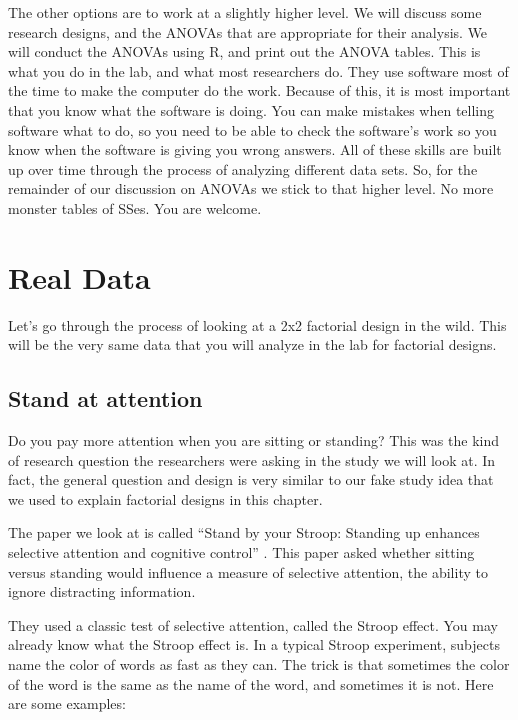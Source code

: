 \documentclass[
]{book}
\begin{document}
The other options are to work at a slightly higher level. We will discuss some research designs, and the ANOVAs that are appropriate for their analysis. We will conduct the ANOVAs using R, and print out the ANOVA tables. This is what you do in the lab, and what most researchers do. They use software most of the time to make the computer do the work. Because of this, it is most important that you know what the software is doing. You can make mistakes when telling software what to do, so you need to be able to check the software's work so you know when the software is giving you wrong answers. All of these skills are built up over time through the process of analyzing different data sets. So, for the remainder of our discussion on ANOVAs we stick to that higher level. No more monster tables of SSes. You are welcome.

\hypertarget{real-data}{%
\section{Real Data}\label{real-data}}

Let's go through the process of looking at a 2x2 factorial design in the wild. This will be the very same data that you will analyze in the lab for factorial designs.

\hypertarget{stand-at-attention}{%
\subsection{Stand at attention}\label{stand-at-attention}}

Do you pay more attention when you are sitting or standing? This was the kind of research question the researchers were asking in the study we will look at. In fact, the general question and design is very similar to our fake study idea that we used to explain factorial designs in this chapter.

The paper we look at is called ``Stand by your Stroop: Standing up enhances selective attention and cognitive control'' \citep{rosenbaum2017stand}. This paper asked whether sitting versus standing would influence a measure of selective attention, the ability to ignore distracting information.

They used a classic test of selective attention, called the Stroop effect. You may already know what the Stroop effect is. In a typical Stroop experiment, subjects name the color of words as fast as they can. The trick is that sometimes the color of the word is the same as the name of the word, and sometimes it is not. Here are some examples:
\end{document}
